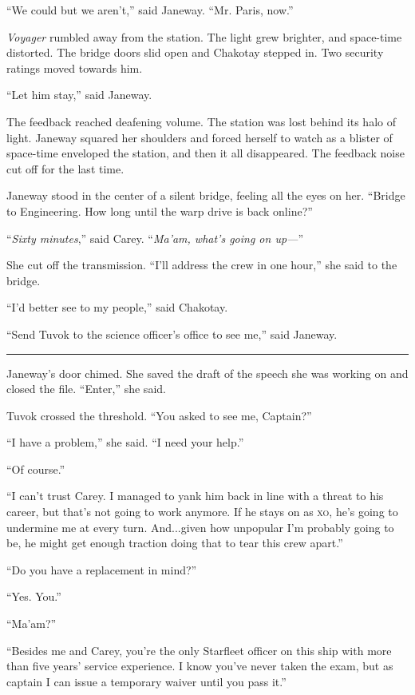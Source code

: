 \documentclass[twoside,letterpaper,12pt]{memoir}
\begin{document}
``We could but we aren’t,” said Janeway. ``Mr. Paris, now.” 

\textit{Voyager} rumbled away from the station. The light grew brighter, and space-time distorted. The bridge doors slid open and Chakotay stepped in. Two security ratings moved towards him. 

``Let him stay,” said Janeway. 

The feedback reached deafening volume. The station was lost behind its halo of light. Janeway squared her shoulders and forced herself to watch as a blister of space-time enveloped the station, and then it all disappeared. The feedback noise cut off for the last time. 

Janeway stood in the center of a silent bridge, feeling all the eyes on her. ``Bridge to Engineering. How long until the warp drive is back online?” 

``\textit{Sixty minutes},” said Carey. ``\textit{Ma’am, what’s going on up---}” 

She cut off the transmission. ``I’ll address the crew in one hour,” she said to the bridge. 

``I’d better see to my people,” said Chakotay. 

``Send Tuvok to the science officer’s office to see me,” said Janeway. 

\begin{center}\rule{3cm}{0.4 pt}\end{center} 

Janeway’s door chimed. She saved the draft of the speech she was working on and closed the file. ``Enter,” she said. 

Tuvok crossed the threshold. ``You asked to see me, Captain?” 

``I have a problem,” she said. ``I need your help.” 

``Of course.” 

``I can’t trust Carey. I managed to yank him back in line with a threat to his career, but that’s not going to work anymore. If he stays on as \textsc{xo}, he’s going to undermine me at every turn. And...given how unpopular I’m probably going to be, he might get enough traction doing that to tear this crew apart.” 

``Do you have a replacement in mind?” 

``Yes. You.” 

``Ma’am?” 

``Besides me and Carey, you’re the only Starfleet officer on this ship with more than five years’ service experience. I know you’ve never taken the exam, but as captain I can issue a temporary waiver until you pass it.” 
\end{document}
